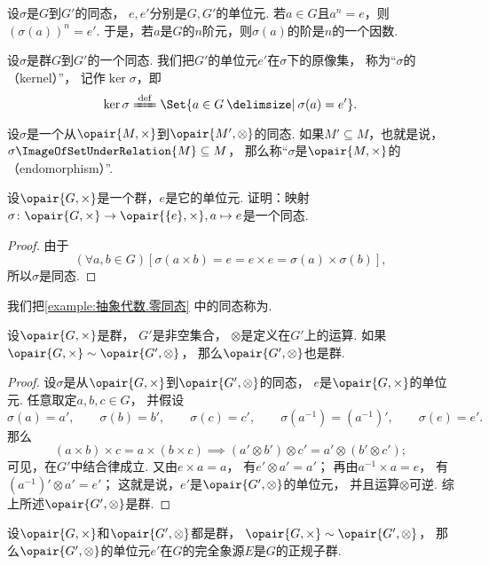 \begin{property}
设\(\sigma\)是\(G\)到\(G'\)的同态，
\(e,e'\)分别是\(G,G'\)的单位元.
若\(a \in G\)且\(a^n = e\)，则\((\sigma(a))^n = e'\).
于是，若\(a\)是\(G\)的\(n\)阶元，则\(\sigma(a)\)的阶是\(n\)的一个因数.
\end{property}

\begin{definition}
设\(\sigma\)是群\(G\)到\(G'\)的一个同态.
我们把\(G'\)的单位元\(e'\)在\(\sigma\)下的原像集，
称为“\(\sigma\)的（kernel）”，
记作\(\ker\sigma\)，即\[
	\ker\sigma \defeq \Set{ a \in G \given \sigma(a) = e' }.
\]
\end{definition}

\begin{definition}
设\(\sigma\)是一个从\(\opair{M,\times}\)到\(\opair{M',\otimes}\)的同态.
如果\(M' \subseteq M\)，也就是说，\(\sigma\ImageOfSetUnderRelation{M}\subseteq M\)，
那么称“\(\sigma\)是\(\opair{M,\times}\)的（endomorphism）”.
\end{definition}

\begin{example}\label{example:抽象代数.零同态}
设\(\opair{G,\times}\)是一个群，\(e\)是它的单位元.
证明：映射\(\sigma\colon\opair{G,\times}\to\opair{\{e\},\times},a\mapsto e\)是一个同态.
\begin{proof}
由于\[
	(\forall a,b\in G)[
		\sigma(a \times b)
		= e
		= e \times e
		= \sigma(a) \times \sigma(b)
	],
\]
所以\(\sigma\)是同态.
\end{proof}
\end{example}
我们把\cref{example:抽象代数.零同态} 中的同态称为.

\begin{theorem}\label{theorem:抽象代数.群的同态象是群}
设\(\opair{G,\times}\)是群，
\(G'\)是非空集合，
\(\otimes\)是定义在\(G'\)上的运算.
如果\(\opair{G,\times}\sim\opair{G',\otimes}\)，
那么\(\opair{G',\otimes}\)也是群.
\begin{proof}
设\(\sigma\)是从\(\opair{G,\times}\)到\(\opair{G',\otimes}\)的同态，
\(e\)是\(\opair{G,\times}\)的单位元.
任意取定\(a,b,c\in G\)，
并假设\[
	\sigma(a)=a', \qquad
	\sigma(b)=b', \qquad
	\sigma(c)=c', \qquad
	\sigma(a^{-1})=(a^{-1})', \qquad
	\sigma(e)=e'.
\]
那么\[
	(a \times b)\times c = a \times(b \times c)
	\implies
	(a' \otimes b')\otimes c' = a' \otimes(b' \otimes c');
\]
可见，在\(G'\)中结合律成立.
又由\(e\times a=a\)，
有\(e'\otimes a'=a'\)；
再由\(a^{-1}\times a=e\)，
有\((a^{-1})'\otimes a'=e'\)；
这就是说，\(e'\)是\(\opair{G',\otimes}\)的单位元，
并且运算\(\otimes\)可逆.
综上所述\(\opair{G',\otimes}\)是群.
\end{proof}
\end{theorem}

\begin{theorem}
设\(\opair{G,\times}\)和\(\opair{G',\otimes}\)都是群，
\(\opair{G,\times}\sim\opair{G',\otimes}\)，
那么\(\opair{G',\otimes}\)的单位元\(e'\)在\(G\)的完全象源\(E\)是\(G\)的正规子群.
\end{theorem}
